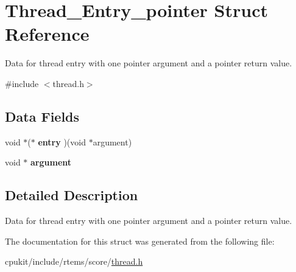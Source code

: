 \hypertarget{structThread__Entry__pointer}{}\section{Thread\+\_\+\+Entry\+\_\+pointer Struct Reference}
\label{structThread__Entry__pointer}


Data for thread entry with one pointer argument and a pointer return value.  




{\ttfamily \#include $<$thread.\+h$>$}

\subsection*{Data Fields}
\begin{DoxyCompactItemize}
\item 
\mbox{\label{structThread__Entry__pointer_af228eb779f282a7b8f798cb2d954d7f9}} 
void $\ast$($\ast$ {\bfseries entry} )(void $\ast$argument)
\item 
\mbox{\label{structThread__Entry__pointer_a1d0fa70378fa23b4224702c9d02afd32}} 
void $\ast$ {\bfseries argument}
\end{DoxyCompactItemize}


\subsection{Detailed Description}
Data for thread entry with one pointer argument and a pointer return value. 

The documentation for this struct was generated from the following file\+:\begin{DoxyCompactItemize}
\item 
cpukit/include/rtems/score/\mbox{\hyperlink{score_2thread_8h}{thread.\+h}}\end{DoxyCompactItemize}
